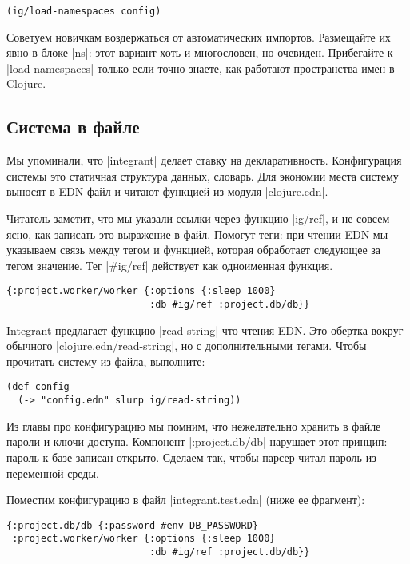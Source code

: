 \begin{verbatim}
(ig/load-namespaces config)
\end{verbatim}

Советуем новичкам воздержаться от автоматических импортов. Размещайте их явно в
блоке \spverb|ns|: этот вариант хоть и многословен, но очевиден. Прибегайте к
\spverb|load-namespaces| только если точно знаете, как работают пространства
имен в Clojure.

\subsection{Система в файле}

Мы упоминали, что \spverb|integrant| делает ставку на
декларативность. Конфигурация системы это статичная структура данных,
словарь. Для экономии места систему выносят в EDN-файл и читают функцией из
модуля \spverb|clojure.edn|.

Читатель заметит, что мы указали ссылки через функцию \spverb|ig/ref|, и не
совсем ясно, как записать это выражение в файл. Помогут теги: при чтении EDN мы
указываем связь между тегом и функцией, которая обработает следующее за тегом
значение. Тег \spverb|#ig/ref| действует как одноименная функция.

\begin{verbatim}
{:project.worker/worker {:options {:sleep 1000}
                         :db #ig/ref :project.db/db}}
\end{verbatim}

Integrant предлагает функцию \spverb|read-string| что чтения EDN. Это обертка
вокруг обычного \spverb|clojure.edn/read-string|, но с дополнительными
тегами. Чтобы прочитать систему из файла, выполните:

\begin{verbatim}
(def config
  (-> "config.edn" slurp ig/read-string))
\end{verbatim}


Из главы про конфигурацию мы помним, что нежелательно хранить в файле пароли и
ключи доступа. Компонент \spverb|:project.db/db| нарушает этот принцип: пароль к
базе записан открыто. Сделаем так, чтобы парсер читал пароль из переменной
среды.

Поместим конфигурацию в файл \spverb|integrant.test.edn| (ниже ее фрагмент):

\begin{verbatim}
{:project.db/db {:password #env DB_PASSWORD}
 :project.worker/worker {:options {:sleep 1000}
                         :db #ig/ref :project.db/db}}
\end{verbatim}

